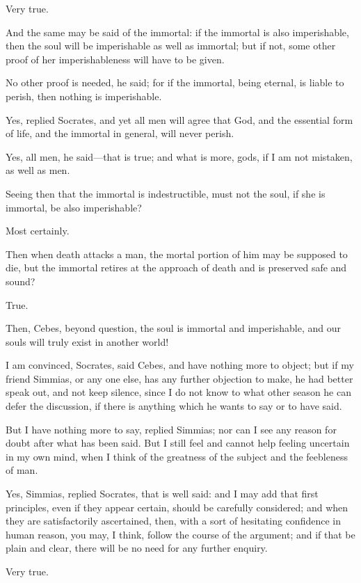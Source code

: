 Very true.

And the same may be said of the immortal: if the immortal is also
imperishable, then the soul will be imperishable as well as immortal; but
if not, some other proof of her imperishableness will have to be given.

No other proof is needed, he said; for if the immortal, being eternal, is
liable to perish, then nothing is imperishable.

Yes, replied Socrates, and yet all men will agree that God, and the
essential form of life, and the immortal in general, will never perish.

Yes, all men, he said—that is true; and what is more, gods, if I am
not mistaken, as well as men.

Seeing then that the immortal is indestructible, must not the soul, if she
is immortal, be also imperishable?

Most certainly.

Then when death attacks a man, the mortal portion of him may be supposed
to die, but the immortal retires at the approach of death and is preserved
safe and sound?

True.

Then, Cebes, beyond question, the soul is immortal and imperishable, and
our souls will truly exist in another world!

I am convinced, Socrates, said Cebes, and have nothing more to object; but
if my friend Simmias, or any one else, has any further objection to make,
he had better speak out, and not keep silence, since I do not know to what
other season he can defer the discussion, if there is anything which he
wants to say or to have said.

But I have nothing more to say, replied Simmias; nor can I see any reason
for doubt after what has been said. But I still feel and cannot help
feeling uncertain in my own mind, when I think of the greatness of the
subject and the feebleness of man.

Yes, Simmias, replied Socrates, that is well said: and I may add that
first principles, even if they appear certain, should be carefully
considered; and when they are satisfactorily ascertained, then, with a
sort of hesitating confidence in human reason, you may, I think, follow
the course of the argument; and if that be plain and clear, there will be
no need for any further enquiry.

Very true.

